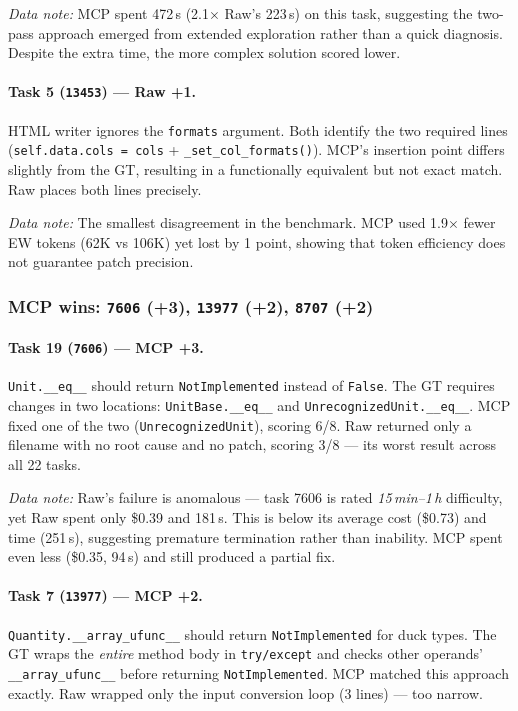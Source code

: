 \emph{Data note:} MCP spent 472\,s (2.1$\times$ Raw's 223\,s)
on this task, suggesting the two-pass approach emerged from extended
exploration rather than a quick diagnosis.  Despite the extra time,
the more complex solution scored lower.

\paragraph{Task 5 (\texttt{13453}) --- Raw +1.}
HTML writer ignores the \texttt{formats} argument.
Both identify the two required lines
(\texttt{self.data.cols = cols} + \texttt{\_set\_col\_formats()}).
MCP's insertion point differs slightly from the GT, resulting in a
functionally equivalent but not exact match.
Raw places both lines precisely.

\emph{Data note:} The smallest disagreement in the benchmark.
MCP used 1.9$\times$ fewer EW tokens (62K vs 106K) yet lost by 1
point, showing that token efficiency does not guarantee patch
precision.

\subsubsection{MCP wins: \texttt{7606} (+3), \texttt{13977} (+2),
               \texttt{8707} (+2)}

\paragraph{Task 19 (\texttt{7606}) --- MCP +3.}
\texttt{Unit.\_\_eq\_\_} should return \texttt{NotImplemented} instead
of \texttt{False}.
The GT requires changes in two locations:
\texttt{UnitBase.\_\_eq\_\_} and \texttt{UnrecognizedUnit.\_\_eq\_\_}.
MCP fixed one of the two (\texttt{UnrecognizedUnit}), scoring 6/8.
Raw returned only a filename with no root cause and no patch,
scoring 3/8 --- its worst result across all 22 tasks.

\emph{Data note:} Raw's failure is anomalous --- task 7606 is rated
\emph{15\,min--1\,h} difficulty, yet Raw spent only \$0.39 and 181\,s.
This is below its average cost (\$0.73) and time (251\,s),
suggesting premature termination rather than inability.
MCP spent even less (\$0.35, 94\,s) and still produced a partial fix.

\paragraph{Task 7 (\texttt{13977}) --- MCP +2.}
\texttt{Quantity.\_\_array\_ufunc\_\_} should return
\texttt{NotImplemented} for duck types.
The GT wraps the \emph{entire} method body in
\texttt{try/except} and checks other operands'
\texttt{\_\_array\_ufunc\_\_} before returning
\texttt{NotImplemented}.
MCP matched this approach exactly.
Raw wrapped only the input conversion loop (3 lines) --- too narrow.

